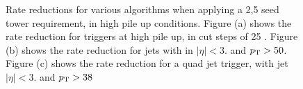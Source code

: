\begin{figure}[h!]
    \centering
     \newline
    \caption{Rate reductions for various \Lone algorithms when applying a 2,5 \GeV seed tower requirement, in high pile up
    conditions. Figure (a) shows the rate reduction for \HT triggers at high pile up, in cut steps of 25 \GeV. Figure (b) shows
    the rate reduction for jets with in $|\eta| <3.$ and $p_{\mathrm{T}} > 50$\GeV. Figure (c) shows the rate reduction for a quad jet
    trigger, with jet $|\eta| <3.$ and $p_{\mathrm{T}} > 38$\GeV}
    
    \label{fig:highpuratereduction}
\end{figure}

